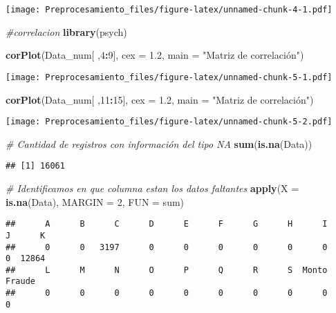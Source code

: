 \documentclass[]{article}
\newenvironment{Shaded}{\begin{snugshade}}{\end{snugshade}}
\newcommand{\CommentTok}[1]{\textcolor[rgb]{0.56,0.35,0.01}{\textit{#1}}}
\newcommand{\DataTypeTok}[1]{\textcolor[rgb]{0.13,0.29,0.53}{#1}}
\newcommand{\DecValTok}[1]{\textcolor[rgb]{0.00,0.00,0.81}{#1}}
\newcommand{\FloatTok}[1]{\textcolor[rgb]{0.00,0.00,0.81}{#1}}
\newcommand{\KeywordTok}[1]{\textcolor[rgb]{0.13,0.29,0.53}{\textbf{#1}}}
\newcommand{\NormalTok}[1]{#1}
\newcommand{\OperatorTok}[1]{\textcolor[rgb]{0.81,0.36,0.00}{\textbf{#1}}}
\newcommand{\StringTok}[1]{\textcolor[rgb]{0.31,0.60,0.02}{#1}}
\begin{document}
\texttt{[image: Preprocesamiento\_files/figure-latex/unnamed-chunk-4-1.pdf]}

\begin{Shaded}
\begin{Highlighting}[]
\CommentTok{#correlacion}
\KeywordTok{library}\NormalTok{(psych)}

\KeywordTok{corPlot}\NormalTok{(Data_num[ ,}\DecValTok{4}\OperatorTok{:}\DecValTok{9}\NormalTok{], }\DataTypeTok{cex =} \FloatTok{1.2}\NormalTok{, }\DataTypeTok{main =} \StringTok{"Matriz de correlación")}
\end{Highlighting}
\end{Shaded}

\texttt{[image: Preprocesamiento\_files/figure-latex/unnamed-chunk-5-1.pdf]}

\begin{Shaded}
\begin{Highlighting}[]
\KeywordTok{corPlot}\NormalTok{(Data_num[ ,}\DecValTok{11}\OperatorTok{:}\DecValTok{15}\NormalTok{], }\DataTypeTok{cex =} \FloatTok{1.2}\NormalTok{, }\DataTypeTok{main =} \StringTok{"Matriz de correlación")}
\end{Highlighting}
\end{Shaded}

\texttt{[image: Preprocesamiento\_files/figure-latex/unnamed-chunk-5-2.pdf]}

\begin{Shaded}
\begin{Highlighting}[]
\CommentTok{# Cantidad de registros con información del tipo NA}
\KeywordTok{sum}\NormalTok{(}\KeywordTok{is.na}\NormalTok{(Data))}
\end{Highlighting}
\end{Shaded}

\begin{verbatim}
## [1] 16061
\end{verbatim}

\begin{Shaded}
\begin{Highlighting}[]
\CommentTok{# Identificamos en que columna estan los datos faltantes}
\KeywordTok{apply}\NormalTok{(}\DataTypeTok{X =} \KeywordTok{is.na}\NormalTok{(Data), }\DataTypeTok{MARGIN =} \DecValTok{2}\NormalTok{, }\DataTypeTok{FUN =}\NormalTok{ sum)}
\end{Highlighting}
\end{Shaded}

\begin{verbatim}
##      A      B      C      D      E      F      G      H      I      J      K 
##      0      0   3197      0      0      0      0      0      0      0  12864 
##      L      M      N      O      P      Q      R      S  Monto Fraude 
##      0      0      0      0      0      0      0      0      0      0
\end{verbatim}
\end{document}
